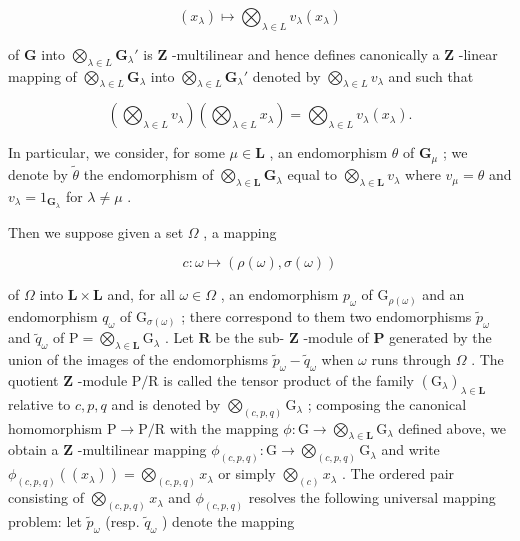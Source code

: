 \[
(x _ {\lambda}) \mapsto \bigotimes_ {\lambda \in L} v _ {\lambda} (x _ {\lambda})
\]

of \(\mathbf{G}\) into \(\bigotimes_{\lambda \in L} \mathbf{G}_{\lambda}'\) is \(\mathbf{Z}\) -multilinear and hence defines canonically a \(\mathbf{Z}\) -linear mapping of \(\bigotimes_{\lambda \in L} \mathbf{G}_{\lambda}\) into \(\bigotimes_{\lambda \in L} \mathbf{G}_{\lambda}'\) denoted by \(\bigotimes_{\lambda \in L} v_{\lambda}\) and such that

\[
\left(\bigotimes_ {\lambda \in L} v _ {\lambda}\right) \left(\bigotimes_ {\lambda \in L} x _ {\lambda}\right) = \bigotimes_ {\lambda \in L} v _ {\lambda} (x _ {\lambda}).\tag{25}
\]

In particular, we consider, for some \(\mu \in \mathbf{L}\) , an endomorphism \(\theta\) of \(\mathbf{G}_{\mu}\) ; we denote by \(\tilde{\theta}\) the endomorphism of \(\bigotimes_{\lambda \in \mathbf{L}} \mathbf{G}_{\lambda}\) equal to \(\bigotimes_{\lambda \in \mathbf{L}} v_{\lambda}\) where \(v_{\mu} = \theta\) and \(v_{\lambda} = 1_{\mathbf{G}_{\lambda}}\) for \(\lambda \neq \mu\) .

Then we suppose given a set \(\Omega\) , a mapping

\[
c: \omega \mapsto (\rho (\omega), \sigma (\omega))
\]

of \(\Omega\) into \(\mathbf{L} \times \mathbf{L}\) and, for all \(\omega \in \Omega\) , an endomorphism \(p_{\omega}\) of \(\mathrm{G}_{\rho(\omega)}\) and an endomorphism \(q_{\omega}\) of \(\mathrm{G}_{\sigma(\omega)}\) ; there correspond to them two endomorphisms \(\tilde{p}_{\omega}\) and \(\tilde{q}_{\omega}\) of \(\mathrm{P} = \bigotimes_{\lambda \in \mathbf{L}} \mathrm{G}_{\lambda}\) . Let \(\mathbf{R}\) be the sub- \(\mathbf{Z}\) -module of \(\mathbf{P}\) generated by the union of the images of the endomorphisms \(\tilde{p}_{\omega} - \tilde{q}_{\omega}\) when \(\omega\) runs through \(\Omega\) . The quotient \(\mathbf{Z}\) -module \(\mathrm{P/R}\) is called the tensor product of the family \((\mathrm{G}_{\lambda})_{\lambda \in \mathbf{L}}\) relative to \(c, p, q\) and is denoted by \(\bigotimes_{(c, p, q)} \mathrm{G}_{\lambda}\) ; composing the canonical homomorphism \(\mathrm{P} \to \mathrm{P/R}\) with the mapping \(\phi: \mathrm{G} \to \bigotimes_{\lambda \in \mathbf{L}} \mathrm{G}_{\lambda}\) defined above, we obtain a \(\mathbf{Z}\) -multilinear mapping \(\phi_{(c, p, q)}: \mathrm{G} \to \bigotimes_{(c, p, q)} \mathrm{G}_{\lambda}\) and write \(\phi_{(c, p, q)}((x_{\lambda})) = \bigotimes_{(c, p, q)} x_{\lambda}\) or simply \(\bigotimes_{(c)} x_{\lambda}\) . The ordered pair consisting of \(\bigotimes_{(c, p, q)} x_{\lambda}\) and \(\phi_{(c, p, q)}\) resolves the following universal mapping problem: let \(\tilde{p}_{\omega}\) (resp. \(\tilde{q}_{\omega}\) ) denote the mapping

